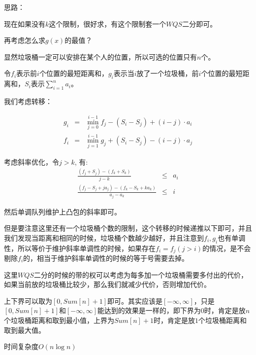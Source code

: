 思路：\par

现在如果没有$k$这个限制，很好求，有这个限制套一个$WQS$二分即可。\par

再考虑怎么求$g(x)$的最值？\par
显然垃圾桶一定可以安排在某个人的位置，所以可选的位置只有$n$个。\par 

令$f_i$表示前$i$个位置的最短距离和，$g_i$表示当$i$放了一个垃圾桶，前$i$个位置的最短距离和，$S_i$表示$\sum\limits_{i = 1}^n a_i$。\par

我们考虑转移：

\begin{eqnarray*}
g_i &=& \min\limits_{j = 0}^{i - 1} f_j - (S_i - S_j) + (i - j) \cdot a_i \\
f_i &=& \min\limits_{j = 1}^{i - 1} g_j + (S_i - S_j) - (i - j) \cdot a_j
\end{eqnarray*}

考虑斜率优化，令$j > k$, 有:
\begin{eqnarray*}
\frac{(f_j + S_j) - (f_k + S_k)}{j - k} &\leq& a_i \\
\frac{(f_j - S_j + ja_j) - (f_k - S_k + ka_k)}{a_j - a_k} &\leq& i
\end{eqnarray*}

然后单调队列维护上凸包的斜率即可。\par

但是要注意这里还有一个垃圾桶个数的限制，这个转移的时候递推以下即可，并且我们发现当距离和相同的时候，垃圾桶个数越少越好，并且注意到$f_i, g_i$也有单调性，所以等价于维护斜率单调性的时候，如果存在$f_i = f_j(j > i)$的情况，是不会剔除$f_i$的，相当于维护斜率单调性的时候的等于号需要去掉。\par

这里$WQS$二分的时候的带的权可以考虑为每多加一个垃圾桶需要多付出的代价，如果当前放的垃圾桶比较少，那么我们就减少代价，否则增加代价。\par
上下界可以取为$[0, Sum[n] + 1]$即可。其实应该是$[-\infty, \infty]$，只是$[0, Sum[n] + 1]$和$[-\infty, \infty]$能达到的效果是一样的，即下界为$0$时，肯定是放$n$个垃圾桶距离和取到最小值，上界为$Sum[n] + 1$时，肯定是放$1$个垃圾桶距离和取到最大值。\par

时间复杂度$O(n \log n)$\par

